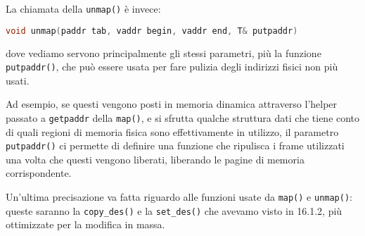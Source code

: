 \documentclass[a4paper,11pt]{article}
\begin{document}
La chiamata della \lstinline|unmap()| è invece:
\begin{lstlisting}[language=C++, style=codestyle]	
void unmap(paddr tab, vaddr begin, vaddr end, T& putpaddr)
\end{lstlisting}
dove vediamo servono principalmente gli stessi parametri, più la funzione \lstinline|putpaddr()|, che può essere usata per fare pulizia degli indirizzi fisici non più usati.

Ad esempio, se questi vengono posti in memoria dinamica attraverso l'helper passato a \lstinline|getpaddr| della \lstinline|map()|, e si sfrutta qualche struttura dati che tiene conto di quali regioni di memoria fisica sono effettivamente in utilizzo, il parametro \lstinline|putpaddr()| ci permette di definire una funzione che ripulisca i frame utilizzati una volta che questi vengono liberati, liberando le pagine di memoria corrispondente.

Un'ultima precisazione va fatta riguardo alle funzioni usate da \lstinline|map()| e \lstinline|unmap()|: queste saranno la \lstinline|copy_des()| e la \lstinline|set_des()| che avevamo visto in 16.1.2, più ottimizzate per la modifica in massa.
\end{document}
